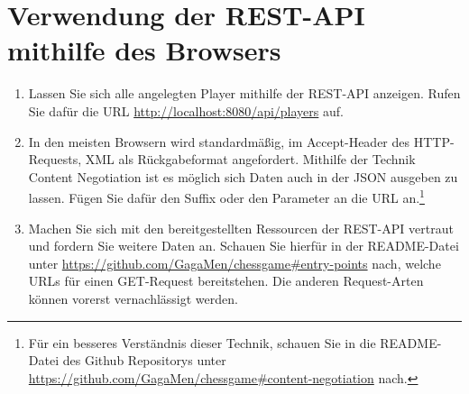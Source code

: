 \section{Verwendung der REST-API mithilfe des Browsers}
\begin{enumerate}
	\item Lassen Sie sich alle angelegten Player mithilfe der \gls{REST}-\gls{API} anzeigen. Rufen Sie dafür die \gls{URL} \url{http://localhost:8080/api/players} auf.
	\item In den meisten Browsern wird standardmäßig, im Accept-Header des \gls{HTTP}-Requests, \acrfull{XML} als Rückgabeformat angefordert. Mithilfe der Technik Content Negotiation ist es möglich sich Daten auch in der \acrfull{JSON} ausgeben zu lassen. Fügen Sie dafür den Suffix  oder den Parameter  an die \gls{URL} an.\footnote{Für ein besseres Verständnis dieser Technik, schauen Sie in die README-Datei des Github Repositorys unter \url{https://github.com/GagaMen/chessgame\#content-negotiation} nach.}
	\item Machen Sie sich mit den bereitgestellten Ressourcen der \gls{REST}-\gls{API} vertraut und fordern Sie weitere Daten an. Schauen Sie hierfür in der README-Datei unter \url{https://github.com/GagaMen/chessgame\#entry-points} nach, welche \glspl{URL} für einen GET-Request bereitstehen. Die anderen Request-Arten können vorerst vernachlässigt werden.
\end{enumerate}

